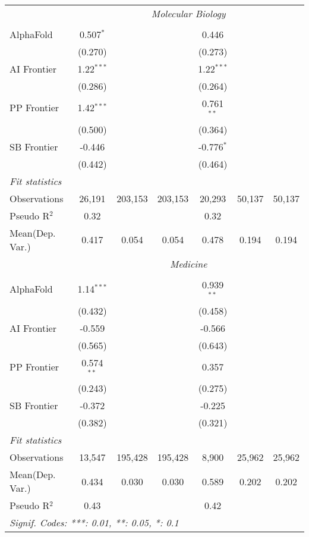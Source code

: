 \begin{tabular}{lcccccc}
 & \multicolumn{6}{c}{\textit{Molecular Biology}} \\ \\
   AlphaFold    & 0.507$^{*}$  &         &         & 0.446        &        &   \\   
                & (0.270)      &         &         & (0.273)      &        &   \\   
   AI Frontier  & 1.22$^{***}$ &         &         & 1.22$^{***}$ &        &   \\   
                & (0.286)      &         &         & (0.264)      &        &   \\   
   PP Frontier  & 1.42$^{***}$ &         &         & 0.761$^{**}$ &        &   \\   
                & (0.500)      &         &         & (0.364)      &        &   \\   
   SB Frontier  & -0.446       &         &         & -0.776$^{*}$ &        &   \\   
                & (0.442)      &         &         & (0.464)      &        &   \\   
   \midrule
   \emph{Fit statistics}\\
   Observations & 26,191       & 203,153 & 203,153 & 20,293       & 50,137 & 50,137\\  
   Pseudo R$^2$ & 0.32         &         &         & 0.32         &        & \\  
   
Mean(Dep. Var.) & 0.417 & 0.054 & 0.054 & 0.478 & 0.194 & 0.194 \\
 & \multicolumn{6}{c}{\textit{Medicine}} \\ \\
   AlphaFold    & 1.14$^{***}$ &         &         & 0.939$^{**}$ &        &   \\   
                & (0.432)      &         &         & (0.458)      &        &   \\   
   AI Frontier  & -0.559       &         &         & -0.566       &        &   \\   
                & (0.565)      &         &         & (0.643)      &        &   \\   
   PP Frontier  & 0.574$^{**}$ &         &         & 0.357        &        &   \\   
                & (0.243)      &         &         & (0.275)      &        &   \\   
   SB Frontier  & -0.372       &         &         & -0.225       &        &   \\   
                & (0.382)      &         &         & (0.321)      &        &   \\   
   \midrule
   \emph{Fit statistics}\\
   Observations & 13,547       & 195,428 & 195,428 & 8,900        & 25,962 & 25,962\\  
Mean(Dep. Var.) & 0.434 & 0.030 & 0.030 & 0.589 & 0.202 & 0.202 \\
   Pseudo R$^2$ & 0.43         &         &         & 0.42         &        & \\  
   \midrule \midrule
   \multicolumn{7}{l}{\emph{Signif. Codes: ***: 0.01, **: 0.05, *: 0.1}}\\
\end{tabular}
\par\endgroup
